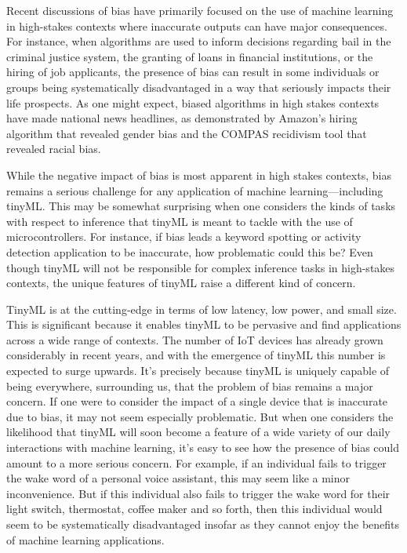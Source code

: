 Recent discussions of bias have primarily focused on the use of machine learning in high-stakes contexts where inaccurate outputs can have major consequences. For instance, when algorithms are used to inform decisions regarding bail in the criminal justice system, the granting of loans in financial institutions, or the hiring of job applicants, the presence of bias can result in some individuals or groups being systematically disadvantaged in a way that seriously impacts their life prospects. As one might expect, biased algorithms in high stakes contexts have made national news headlines, as demonstrated by Amazon’s hiring algorithm that revealed gender bias and the COMPAS recidivism tool that revealed racial bias.

While the negative impact of bias is most apparent in high stakes contexts, bias remains a serious challenge for any application of machine learning—including tinyML. This may be somewhat surprising when one considers the kinds of tasks with respect to inference that tinyML is meant to tackle with the use of microcontrollers. For instance, if bias leads a keyword spotting or activity detection application to be inaccurate, how problematic could this be? Even though tinyML will not be responsible for complex inference tasks in high-stakes contexts, the unique features of tinyML raise a different kind of concern. 

TinyML is at the cutting-edge in terms of low latency, low power, and small size. This is significant because it enables tinyML to be pervasive and find applications across a wide range of contexts. The number of IoT devices has already grown considerably in recent years, and with the emergence of tinyML this number is expected to surge upwards. It’s precisely because tinyML is uniquely capable of being everywhere, surrounding us, that the problem of bias remains a major concern. If one were to consider the impact of a single device that is inaccurate due to bias, it may not seem especially problematic. But when one considers the likelihood that tinyML will soon become a feature of a wide variety of our daily interactions with machine learning, it’s easy to see how the presence of bias could amount to a more serious concern. For example, if an individual fails to trigger the wake word of a personal voice assistant, this may seem like a minor inconvenience. But if this individual also fails to trigger the wake word for their light switch, thermostat, coffee maker and so forth, then this individual would seem to be systematically disadvantaged insofar as they cannot enjoy the benefits of machine learning applications.


